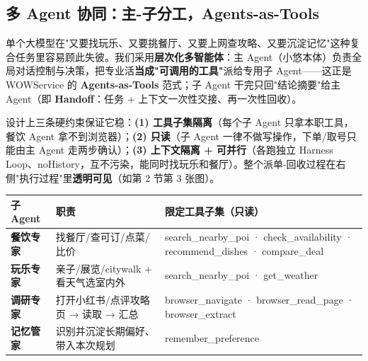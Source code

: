 \documentclass[11pt,a4paper]{ctexart}
\begin{document}
\begin{center}
\end{center}

\subsection{多 Agent 协同：主-子分工，Agents-as-Tools}
单个大模型在"又要找玩乐、又要挑餐厅、又要上网查攻略、又要沉淀记忆"这种复合任务里容易顾此失彼。我们采用\textbf{层次化多智能体}：主 Agent（小悠本体）负责全局对话控制与决策，把专业活\textbf{当成"可调用的工具"}派给专用子 Agent——这正是 WOWService 的 \textbf{Agents-as-Tools} 范式；子 Agent 干完只回"结论摘要"给主 Agent（即 \textbf{Handoff}：任务 + 上下文一次性交接、再一次性回收）。

设计上三条硬约束保证它稳：\textbf{(1) 工具子集隔离}（每个子 Agent 只拿本职工具，餐饮 Agent 拿不到浏览器）；\textbf{(2) 只读}（子 Agent 一律不做写操作，下单/取号只能由主 Agent 走两步确认）；\textbf{(3) 上下文隔离 + 可并行}（各跑独立 Harness Loop、noHistory，互不污染，能同时找玩乐和餐厅）。整个派单-回收过程在右侧"执行过程"里\textbf{透明可见}（如第 2 节第 3 张图）。

\begin{center}
{\small
\begin{tabularx}{\linewidth}{>{\bfseries}p{2.1cm} p{3.0cm} >{\raggedright\arraybackslash}X}
\toprule
子 Agent & 职责 & 限定工具子集（只读） \\
\midrule
餐饮专家 & 找餐厅/查可订/点菜/比价 & search\_nearby\_poi · check\_availability · recommend\_dishes · compare\_deal \\
玩乐专家 & 亲子/展览/citywalk + 看天气选室内外 & search\_nearby\_poi · get\_weather \\
调研专家 & 打开小红书/点评攻略页 → 读取 → 汇总 & browser\_navigate · browser\_read\_page · browser\_extract \\
记忆管家 & 识别并沉淀长期偏好、带入本次规划 & remember\_preference \\
\bottomrule
\end{tabularx}}
\end{center}
\end{document}
